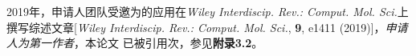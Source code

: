 2019年，申请人团队受邀为\hnamd{}的应用在\textit{Wiley Interdiscip. Rev.:
  Comput. Mol. Sci.}上撰写综述文章[\textit{Wiley Interdiscip. Rev.:
  Comput. Mol. Sci.}, \textbf{9}, e1411 (2019)]，\emph{申请人为第一作者}，本论文
已被引用次，参见\textbf{附录3.2}。

